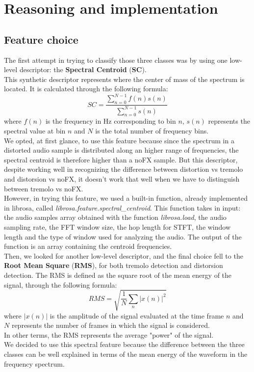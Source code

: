 \documentclass[a4paper,12pt]{report}
\begin{document}
\chapter{Reasoning and implementation}
\section{Feature choice}
The first attempt in trying to classify those three classes was by using one low-level descriptor: the \textbf{Spectral Centroid} (\textbf{SC}).
\\This synthetic descriptor represents where the center of mass of the spectrum is located. It is calculated through the following formula:
\[ SC =\frac{\sum_{n=0}^{N-1}f(n)s(n)}{\sum_{n=0}^{N-1}s(n)}  \] where $f(n)$ is the frequency in Hz corresponding to bin $n$, $s(n)$ represents the spectral value at bin $n$ and $N$ is the total number of frequency bins.
\\We opted, at first glance, to use this feature because since the spectrum in a distorted audio sample is distributed along an higher range of frequencies, the spectral centroid is therefore higher than a noFX sample. But this descriptor, despite working well in recognizing the difference between distortion vs tremolo and distorsion vs noFX, it doesn't work that well when we have to distinguish between tremolo vs noFX.
\\However, in trying this feature, we used a built-in function, already implemented in librosa, called \emph{librosa.feature.spectral\_centroid}. This function takes in input: the audio samples array obtained with the function \emph{librosa.load}, the audio sampling rate, the FFT window size, the hop length for STFT, the window length and the type of window used for analyzing the audio. The output of the function is an array containing the centroid frequencies.
\\Then, we looked for another low-level descriptor, and the final choice fell to the \textbf{Root Mean Square} (\textbf{RMS}), for both tremolo detection and distorsion detection. 
The RMS is defined as the square root of the mean energy of the signal, through the following formula:
\[ RMS =\sqrt{\frac{1}{N}\sum_{n}^{}|x(n)|^2}  \] where $|x(n)|$ is the amplitude of the signal evaluated at the time frame $n$ and $N$ represents the number of frames in which the signal is considered.
\\In other terms, the RMS represents the average "power" of the signal.
\\We decided to use this spectral feature because the difference between the three classes can be well explained in terms of the mean energy of the waveform in the frequency spectrum.
\end{document}

